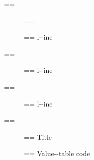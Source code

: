 \documentclass{book}
\makeatletter
\newenvironment{Texinfopreformatted}{%
  \par\GNUTobeylines\obeyspaces\frenchspacing\parskip=\z@\parindent=\z@}{}
{\catcode`\^^M=13 \gdef\GNUTobeylines{\catcode`\^^M=13 \def^^M{\null\par}}}
\newenvironment{Texinfoindented}{\begin{list}{}{}\item\relax}{\end{list}}
\renewcommand{\_}{\Texinfounderscore\discretionary{}{}{}}
\makeatother
\begin{document}
\begin{Texinfoindented}
\begin{Texinfopreformatted}
\end{Texinfopreformatted}
\begin{description}
\item[] \begin{Texinfopreformatted}%
\ttfamily \end{Texinfopreformatted}
\item[{\parbox[b]{\linewidth}{%
\textbf{a--strong}}}]
\begin{Texinfopreformatted}%
\ttfamily l{-}{-}ine
\end{Texinfopreformatted}
\end{description}
\begin{Texinfopreformatted}%
\ttfamily 
\end{Texinfopreformatted}
\begin{description}
\item[{\parbox[b]{\linewidth}{%
a--asis\\
\index[cp]{a--asis@\texttt{a{-}{-}asis}}%
b
\index[cp]{b@\texttt{b}}%
}}]
\begin{Texinfopreformatted}%
\ttfamily l{-}{-}ine
\end{Texinfopreformatted}
\end{description}
\begin{Texinfopreformatted}%
\ttfamily 
\end{Texinfopreformatted}
\begin{description}
\item[{\parbox[b]{\linewidth}{%
\emph{a}\\
\index[fn]{a@\texttt{a}}%
\index[cp]{index entry between item and itemx@index entry between item and itemx}%
\emph{b}
\index[fn]{b@\texttt{b}}%
}}]
\begin{Texinfopreformatted}%
\ttfamily l{-}{-}ine
\end{Texinfopreformatted}
\end{description}
\begin{Texinfopreformatted}%
\ttfamily 
\end{Texinfopreformatted}
\begin{description}
\item[] \begin{Texinfopreformatted}%
\ttfamily Title
\end{Texinfopreformatted}
\item[{\parbox[b]{\linewidth}{%
\texttt{a{-}{-}code}}}]
\begin{Texinfopreformatted}%
\ttfamily Value{-}{-}table code
\end{Texinfopreformatted}

\end{description}
\end{Texinfoindented}
\end{document}
